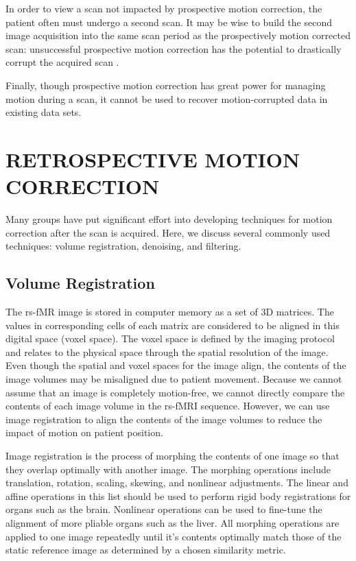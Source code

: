 In order to view a scan not impacted by prospective motion correction, the patient often must undergo a second scan. It may be wise to build the second image acquisition into the same scan period as the prospectively motion corrected scan: unsuccessful prospective motion correction has the potential to drastically corrupt the acquired scan \cite{Zaitsev2017}.

Finally, though prospective motion correction has great power for managing motion during a scan, it cannot be used to recover motion-corrupted data in existing data sets.


\section{RETROSPECTIVE MOTION CORRECTION}

Many groups have put significant effort into developing techniques for motion correction after the scan is acquired. Here, we discuss several commonly used techniques: volume registration, denoising, and filtering. %

\subsection{Volume Registration}

The rs-fMR image is stored in computer memory as a set of 3D matrices. The values in corresponding cells of each matrix are considered to be aligned in this digital space (voxel space). The voxel space is defined by the imaging protocol and relates to the physical space through the spatial resolution of the image. Even though the spatial and voxel spaces for the image align, the contents of the image volumes may be misaligned due to patient movement. Because we cannot assume that an image is completely motion-free, we cannot directly compare the contents of each image volume in the rs-fMRI sequence. However, we can use image registration to align the contents of the image volumes to reduce the impact of motion on patient position.

Image registration is the process of morphing the contents of one image so that they overlap optimally with another image. The morphing operations include translation, rotation, scaling, skewing, and nonlinear adjustments. The linear and affine operations in this list should be used to perform rigid body registrations for organs such as the brain. Nonlinear operations can be used to fine-tune the alignment of more pliable organs such as the liver. All morphing operations are applied to one image repeatedly until it's contents optimally match those of the static reference image as determined by a chosen similarity metric. 

